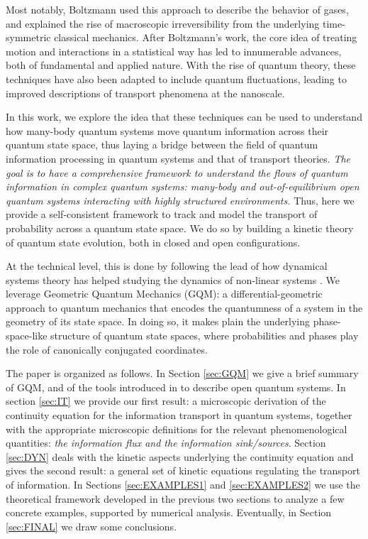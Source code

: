 \documentclass[%
 reprint,
 superscriptaddress,
 aps,
 pra,
]{revtex4-2}
\theoremstyle{definition}
\begin{document}
Most notably, Boltzmann used this approach to describe the behavior of gases, and explained the rise of 
macroscopic irreversibility from the underlying time-symmetric classical mechanics. After 
Boltzmann's work, the core idea of treating motion and interactions in a statistical way has 
led to innumerable advances, both of fundamental and applied nature. With the rise of 
quantum theory, these techniques have also been adapted to include quantum fluctuations, 
leading to improved descriptions of transport phenomena at the nanoscale.
 
In this work, we explore the idea that these techniques can be used to understand how many-body 
quantum systems move quantum information across their quantum state space, thus laying a bridge 
between the field of quantum information processing in quantum systems and that of transport theories. 
\emph{The goal is to have a comprehensive framework to understand the flows of quantum information in complex
quantum systems: many-body and out-of-equilibrium open quantum systems interacting with highly 
structured environments.}
Thus, here we provide a self-consistent framework to track and model the transport of probability across 
a quantum state space. We do so by building a kinetic theory of quantum state evolution, both in closed 
and open configurations.

At the technical level, this is done by following the lead of how dynamical systems theory has helped
studying the dynamics of non-linear systems \cite{Eckmann1985ErgodicTheoryChaos}. We leverage Geometric Quantum Mechanics (GQM): 
a differential-geometric approach to quantum mechanics that encodes the quantumness of a system
in the geometry of its state space. In doing so, it makes plain the underlying phase-space-like
structure of quantum state spaces, where probabilities and phases play the role of canonically 
conjugated coordinates. 

The paper is organized as follows. In Section \ref{sec:GQM} we give a brief summary of 
GQM, and of the tools introduced in \cite{Anza2021DensityMatricesGeometric,Anza2022GeometricQuantumThermodynamics} to describe open quantum systems. 
In section \ref{sec:IT} we provide our first result: a microscopic derivation of the continuity equation 
for the information transport in quantum systems, together with the appropriate microscopic definitions 
for the relevant phenomenological quantities: \emph{the information flux and the information sink/sources}. Section \ref{sec:DYN} 
deals with the kinetic aspects underlying the continuity equation and gives the second result: a general 
set of kinetic equations regulating the transport of information. In Sections \ref{sec:EXAMPLES1} and \ref{sec:EXAMPLES2} 
we use the theoretical framework developed in the previous two sections to analyze a few concrete examples, 
supported by numerical analysis. Eventually, in Section \ref{sec:FINAL} we draw some conclusions. 
\end{document}
